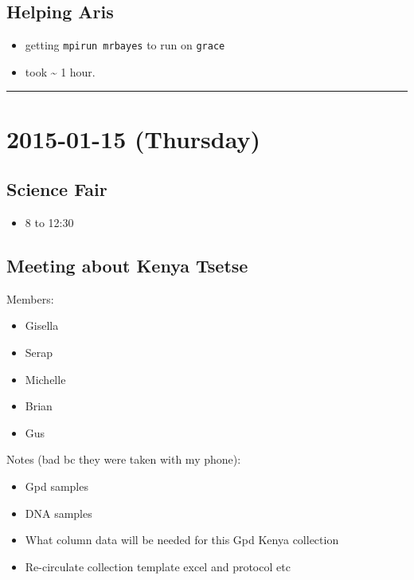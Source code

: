 \documentclass[letterpaper]{scrartcl}
\begin{document}
\subsection{Helping Aris}\label{helping-aris}

\begin{itemize}
\itemsep1pt\parskip0pt
\item
  getting \texttt{mpirun mrbayes} to run on \texttt{grace}
\item
  took \textasciitilde{} 1 hour.
\end{itemize}

\begin{center}\rule{0.5\linewidth}{\linethickness}\end{center}

\section{2015-01-15 (Thursday)}\label{thursday-1}

\subsection{Science Fair}\label{science-fair}

\begin{itemize}
\itemsep1pt\parskip0pt
\item
  8 to 12:30
\end{itemize}

\subsection{Meeting about Kenya
Tsetse}\label{meeting-about-kenya-tsetse}

Members:

\begin{itemize}
\itemsep1pt\parskip0pt
\item
  Gisella
\item
  Serap
\item
  Michelle
\item
  Brian
\item
  Gus
\end{itemize}

Notes (bad bc they were taken with my phone):

\begin{itemize}
\itemsep1pt\parskip0pt
\item
  Gpd samples
\item
  DNA samples
\item
  What column data will be needed for this Gpd Kenya collection
\item
  Re-circulate collection template excel and protocol etc
\end{itemize}
\end{document}

